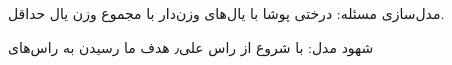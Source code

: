 مدل‌سازی مسئله:
درختی پوشا با یال‌های وزن‌دار با مجموع وزن یال حداقل.

شهود مدل:
با شروع از راس علی٫ هدف ما رسیدن به راس‌های  